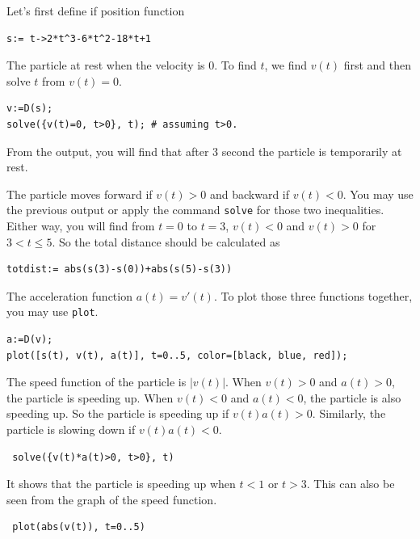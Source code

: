 \documentclass[
  en,11pt,simple]{elegantbook}
\begin{document}
\begin{solution}
{}
Let's first define if position function

\begin{verbatim}
s:= t->2*t^3-6*t^2-18*t+1
\end{verbatim}

The particle at rest when the velocity is 0. To find \(t\), we find \(v(t)\) first and then solve \(t\) from \(v(t)=0\).

\begin{verbatim}
v:=D(s);
solve({v(t)=0, t>0}, t); # assuming t>0.
\end{verbatim}

From the output, you will find that after 3 second the particle is temporarily at rest.

The particle moves forward if \(v(t)>0\) and backward if \(v(t)<0\). You may use the previous output or apply the command \texttt{solve} for those two inequalities. Either way, you will find from \(t=0\) to \(t=3\), \(v(t)<0\) and \(v(t)>0\) for \(3<t\le 5\). So the total distance should be calculated as

\begin{verbatim}
totdist:= abs(s(3)-s(0))+abs(s(5)-s(3))
\end{verbatim}

The acceleration function \(a(t)=v'(t)\). To plot those three functions together, you may use \texttt{plot}.

\begin{verbatim}
a:=D(v);
plot([s(t), v(t), a(t)], t=0..5, color=[black, blue, red]);
\end{verbatim}

The speed function of the particle is \(|v(t)|\). When \(v(t)>0\) and \(a(t)>0\), the particle is speeding up. When \(v(t)<0\) and \(a(t)<0\), the particle is also speeding up. So the particle is speeding up if \(v(t)a(t)>0\). Similarly, the particle is slowing down if \(v(t)a(t)<0\).

\begin{verbatim}
 solve({v(t)*a(t)>0, t>0}, t)
\end{verbatim}

It shows that the particle is speeding up when \(t<1\) or \(t>3\). This can also be seen from the graph of the speed function.

\begin{verbatim}
 plot(abs(v(t)), t=0..5)
\end{verbatim}
\end{solution}
\end{document}
